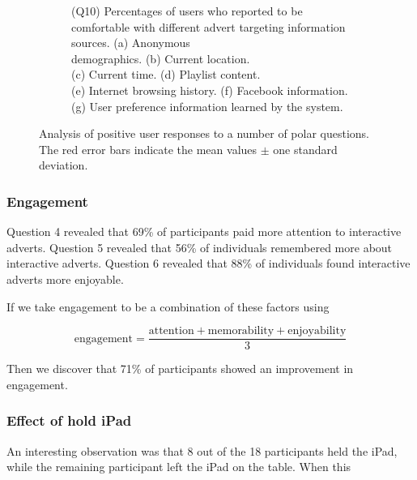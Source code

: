 \begin{figure}[!ht]
\begin{subfigure}[t]{0.49\textwidth}
			\caption{(Q10) Percentages of users who reported to be comfortable with different advert targeting information sources. (a) Anonymous \\demographics. (b) Current location. \\(c) Current time. (d) Playlist content. \\(e) Internet browsing history. (f) Facebook information. (g) User preference information learned by the system.}
		\end{subfigure}
		\caption{Analysis of positive user responses to a number of polar questions. The red error bars indicate the mean values $\pm$ one standard deviation.}
		\label{fig:qualitative_results}
	\end{figure}


	\subsubsection{Engagement}

	Question 4 revealed that 69\% of participants paid more attention to interactive adverts. Question 5 revealed that 56\% of individuals remembered more about interactive adverts. Question 6 revealed that 88\% of individuals found interactive adverts more enjoyable. 

	If we take engagement to be a combination of these factors using

	\begin{equation}
	\text{engagement} = \frac{\text{attention} + \text{memorability} + \text{enjoyability}}{3}
	\end{equation}

	Then we discover that 71\% of participants showed an improvement in engagement.


	\subsubsection{Effect of hold iPad}

	An interesting observation was that 8 out of the 18 participants held the iPad, while the remaining participant left the iPad on the table. When this 

